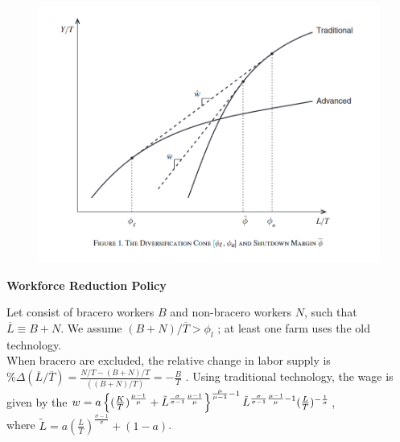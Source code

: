 \documentclass[../root]{subfiles}
\begin{document}
    \begin{figure}
        \centering
        \includegraphics[width = \linewidth]{0731sugiyama/Figure1.png}
        \label{fig:my_label}
    \end{figure}

    {\bf Workforce Reduction Policy}
    
    Let consist of bracero workers $B$ and non-bracero workers $N$, such that $\overline{L} \equiv B+N$. We assume $(B+N)/ \overline{T} > \phi_l$ ; at least one farm uses the old technology.  \\
    When bracero are excluded, the relative change in labor supply is $\% \Delta (\overline{L}/\overline{T}) = \frac{N/T - (B+N)/T}{((B+N)/T)}= -\frac{B}{T}$ . 
    Using traditional technology, the wage is given by the  $w=a\left\{(\frac{K}{T})^{\frac{\mu-1}{\mu}}+\Tilde{L}^{\frac{\sigma}{\sigma-1}\frac{\mu-1}{\mu}} \right\}^{\frac{\mu}{\mu-1}-1}\Tilde{L}^{\frac{\sigma}{\sigma-1}\frac{\mu-1}{\mu}-1}(\frac{L}{T})^{-\frac{1}{\sigma}} $, \\
    where $\tilde{L}= a(\frac{L}{T})^{\frac{\sigma-1}{\sigma}} +(1-a)$.
    
\end{document}
